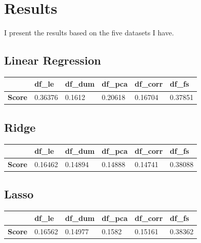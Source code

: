 \section{Results}
I present the results based on the five datasets I have.
\subsection{Linear Regression}
\begin{table}[H]
\begin{tabular}{l|l|l|l|l|l|}
\cline{2-6}
                                    & \textbf{df\_le} & \textbf{df\_dum} & \textbf{df\_pca} & \textbf{df\_corr} & \textbf{df\_fs} \\ \hline
\multicolumn{1}{|l|}{\textbf{Score}} & 0.36376         & 0.1612           & 0.20618          & 0.16704           & 0.37851         \\ \hline
\end{tabular}
\end{table}


\subsection{Ridge}
\begin{table}[H]
\begin{tabular}{l|l|l|l|l|l|}
\cline{2-6}
                                   & \textbf{df\_le} & \textbf{df\_dum} & \textbf{df\_pca} & \textbf{df\_corr} & \textbf{df\_fs} \\ \hline
\multicolumn{1}{|l|}{\textbf{Score}} & 0.16462         & 0.14894           & 0.14888          & 0.14741           & 0.38088         \\ \hline
\end{tabular}
\end{table}



\subsection{Lasso}
\begin{table}[H]
\begin{tabular}{l|l|l|l|l|l|}
\cline{2-6}
                                    & \textbf{df\_le} & \textbf{df\_dum} & \textbf{df\_pca} & \textbf{df\_corr} & \textbf{df\_fs} \\ \hline
\multicolumn{1}{|l|}{\textbf{Score}} & 0.16562         & 0.14977           & 0.1582          & 0.15161           & 0.38362         \\ \hline
\end{tabular}
\end{table}


